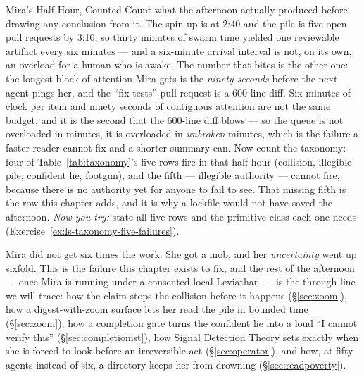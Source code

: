\documentclass[11pt,a4paper]{article}
\theoremstyle{definition}
\theoremstyle{plain}
\begin{document}
\begin{pdexample}{Mira's Half Hour, Counted}
\setlength{\parskip}{4pt plus 1pt}
Count what the afternoon actually produced before drawing any conclusion from it. The spin-up is at 2:40 and the pile is five open pull requests by 3:10, so thirty minutes of swarm time yielded one reviewable artifact every six minutes --- and a six-minute arrival interval is not, on its own, an overload for a human who is awake.
The number that bites is the other one: the longest block of attention Mira gets is the \emph{ninety seconds} before the next agent pings her, and the ``fix tests'' pull request is a $600$-line diff. Six minutes of clock per item and ninety seconds of contiguous attention are not the same budget, and it is the second that the $600$-line diff blows --- so the queue is not overloaded in minutes, it is overloaded in \emph{unbroken} minutes, which is the failure a faster reader cannot fix and a shorter summary can.
Now count the taxonomy: four of Table~\ref{tab:taxonomy}'s five rows fire in that half hour (collision, illegible pile, confident lie, footgun), and the fifth --- illegible authority --- cannot fire, because there is no authority yet for anyone to fail to see. That missing fifth is the row this chapter adds, and it is why a lockfile would not have saved the afternoon.
\emph{Now you try:} state all five rows and the primitive class each one needs (Exercise~\ref{ex:ls-taxonomy-five-failures}).
\end{pdexample}
Mira did not get six times the work. She got a mob, and her \emph{uncertainty} went
up sixfold. This is the failure this chapter exists to fix, and the rest of the
afternoon --- once Mira is running under a consented local Leviathan --- is the
through-line we will trace: how the claim stops the collision before it happens
(\S\ref{sec:zoom}), how a digest-with-zoom surface lets her read the pile in bounded
time (\S\ref{sec:zoom}), how a completion gate turns the confident lie into a loud
``I cannot verify this'' (\S\ref{sec:completionist}), how Signal Detection Theory
sets exactly when she is forced to look before an irreversible act
(\S\ref{sec:operator}), and how, at fifty agents instead of six, a directory keeps
her from drowning (\S\ref{sec:readpoverty}).
\pdexercisepointer{\ref{ex:ls-taxonomy-five-failures}}{\ref{ex:ls-sovereign-vs-oligarchy-experiment}}{\pageref{ex:ls-taxonomy-five-failures}}
\end{document}

